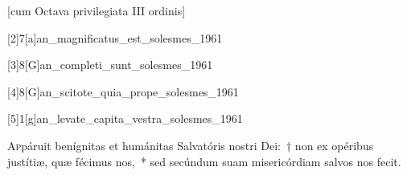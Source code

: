 \documentclass[vesperale_romanum.tex]{subfiles}
\begin{document}
\thispagestyle{empty}




 

 
 
[cum Octava privilegiata III ordinis]



\label{109_8g}  {}

[2]{7}[a]{an_magnificatus_est_solesmes_1961}
\label{110_7a} {} 

[3]{8}[G]{an_completi_sunt_solesmes_1961}

[4]{8}[G]{an_scitote_quia_prope_solesmes_1961}

[5]{1}[g]{an_levate_capita_vestra_solesmes_1961}

\label{cap_24_dec} 
{}

\lettrine{A}{p}páruit benígnitas et humánitas Salvatóris nostri Dei:~† non ex opéribus justítiæ, quæ fécimus nos,~* sed secúndum suam misericórdiam salvos nos fecit.
\end{document}
